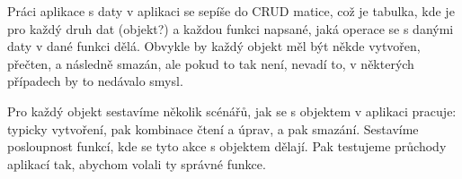 Práci aplikace s daty v aplikaci se sepíše do CRUD matice, což je tabulka, kde je pro každý druh dat (objekt?) a každou funkci napsané, jaká operace se s danými daty v dané funkci dělá. Obvykle by každý objekt měl být někde vytvořen, přečten, a následně smazán, ale pokud to tak není, nevadí to, v některých případech by to nedávalo smysl.

Pro každý objekt sestavíme několik scénářů, jak se s objektem v aplikaci pracuje: typicky vytvoření, pak kombinace čtení a úprav, a pak smazání. Sestavíme posloupnost funkcí, kde se tyto akce s objektem dělají. Pak testujeme průchody aplikací tak, abychom volali ty správné funkce.















